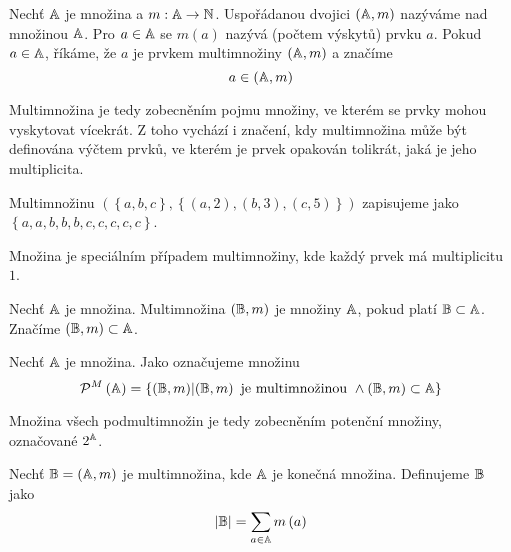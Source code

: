 \begin{define}
	Nechť \( \mathbb A \) je množina a \( m : \mathbb A \to \mathbb N \).
	Uspořádanou dvojici \( \left( \mathbb A, m \right) \) nazýváme  nad množinou \( \mathbb A \). Pro \( a \in \mathbb A \) se \( m \left( a \right) \) nazývá  (počtem výskytů) prvku \( a \). Pokud \( a \in \mathbb A \), říkáme, že \( a \) je prvkem multimnožiny \( \left( \mathbb A, m \right) \) a značíme 
	\[ a \in \left( \mathbb A, m \right) \]
\end{define}

Multimnožina je tedy zobecněním pojmu množiny, ve kterém se prvky mohou vyskytovat vícekrát. Z toho vychází i značení, kdy multimnožina může být definována výčtem prvků, ve kterém je prvek opakován tolikrát, jaká je jeho multiplicita.

\begin{example}
	Multimnožinu \( \left( \left\{ a, b, c \right\}, \left\{ \left( a, 2 \right), \left( b, 3 \right), \left( c, 5 \right) \right\} \right) \) zapisujeme jako \( \left\{ a, a, b, b, b, c, c, c, c, c \right\} \).
\end{example}

\begin{remark}
	Množina je speciálním případem multimnožiny, kde každý prvek má multiplicitu \( 1 \).
\end{remark}

\begin{define}
	Nechť \( \mathbb A \) je množina. Multimnožina \( \left( \mathbb B, m \right) \) je  množiny \( \mathbb A \), pokud platí \( \mathbb B \subset \mathbb A \). Značíme \( \left( \mathbb B, m \right) \subset \mathbb A \).
\end{define}

\begin{define}
	Nechť \( \mathbb A \) je množina. Jako  označujeme množinu
	\[ \mathcal P^M \left( \mathbb A \right) = \left\{ \left( \mathbb B, m \right) \middle| \left( \mathbb B, m \right) \text{ je multimnožinou } \land \left( \mathbb B, m \right) \subset \mathbb A \right\} \]
\end{define}

Množina všech podmultimnožin je tedy zobecněním potenční množiny, označované \( 2^{\mathbb A} \).

\begin{define}
	Nechť \( \mathbb B = \left( \mathbb A, m \right) \) je multimnožina, kde \( \mathbb A \) je konečná množina. Definujeme  \( \mathbb B \) jako
	\[ \left| \mathbb B \right| = \sum_{a \in \mathbb A} m \left( a \right) \]
\end{define}

